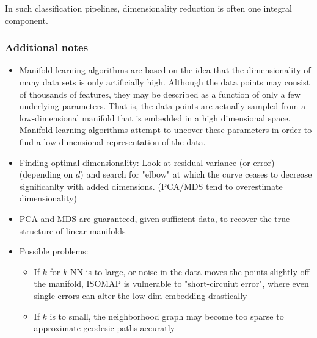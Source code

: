In such classification pipelines, dimensionality reduction is often one integral component.

\subsubsection*{Additional notes}
\begin{itemize}
    \item Manifold learning algorithms are based on the idea that the dimensionality of many data sets is only artificially high. Although the data points may consist of thousands of features, they may be described as a function of only a few underlying parameters. That is, the data points are actually sampled from a low-dimensional manifold that is embedded in a high dimensional space. Manifold learning algorithms attempt to uncover these parameters in order to find a low-dimensional representation of the data.
    \item Finding optimal dimensionality: Look at residual variance (or error) (depending on \(d\)) and search for "elbow" at which the curve ceases to decrease significanlty with added dimensions. (PCA/MDS tend to overestimate dimensionality)
    \item PCA and MDS are guaranteed, given sufficient data, to recover the true structure of linear manifolds
    \item Possible problems:

        \begin{itemize}
            \item If \(k\) for \(k\)-NN is to large, or noise in the data moves the points slightly off the manifold, ISOMAP is vulnerable to "short-circuiut error", where even single errors can alter the low-dim embedding drastically
            \item If \(k\) is to small, the neighborhood graph may become too sparse to approximate geodesic paths accuratly
        \end{itemize}

\end{itemize}
